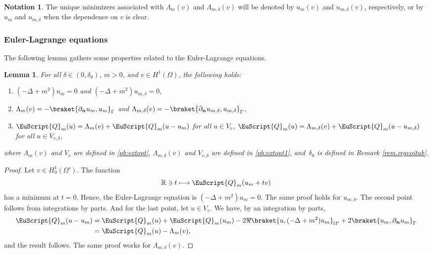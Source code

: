 \documentclass[JEP,XML,SOM,Unicode]{cedram}
\let\mathcal \EuScript
\newcommand\mto{\mathchoice{\longmapsto}{\mapsto}{\mapsto}{\mapsto}}
\newcommand{\cQ}{\mathcal{Q}}
\theoremstyle{plain}
\newtheorem{lemma}[theorem]{Lemma}
\theoremstyle{definition}
\newtheorem{notation}[theorem]{Notation}
\newcommand{\RR}{\mathbb{R}}
\newcommand{\bn}{{\boldsymbol n}}
\let\pa\partial
\begin{document}
\begin{notation}
The unique minimizers associated with $\Lambda_{m}(v)$ and $\Lambda_{m,\delta}(v)$ will be denoted by $u_m(v)$ and $u_{m,\delta}(v)$, respectively, or by $u_m$ and $u_{m,\delta}$ when the dependence on $v$ is clear.
\end{notation}

\subsubsection{Euler-Lagrange equations}

The following lemma gathers some properties related to the Euler-Lagrange equations.

\begin{lemma}\label{lem:ELE}
For all $\delta\in(0,\delta_0)$, $m>0$, and $v\in H^1(\Omega)$, the following holds:
\begin{enumerate}
\item\label{pt:cp1} $(-\Delta+m^2)u_m = 0$ and $(-\Delta+m^2)u_{m,\delta}=0$,
\item\label{pt:cp2} $\Lambda_m(v) = -\braket{\pa_\bn u_m,u_m}_\Gamma$ and $\Lambda_{m,\delta}(v) = -\braket{\pa_\bn u_{m,\delta},u_{m,\delta}}_{\Gamma}$,
\item\label{pt:cp4} $\cQ_m(u) = \Lambda_m(v) + \cQ_m(u-u_m)$ for all $u\in V_v$,
$\cQ_{m}(u) = \Lambda_{m,\delta}(v) + \cQ_{m}(u-u_{m,\delta})$ for all $u\in V_{v,\delta}$,
\end{enumerate}
where $\Lambda_m(v)$ and $V_v$ are defined in \eqref{pb:extopt}, $\Lambda_{m,\delta}(v)$ and $V_{v,\delta}$ are defined in \eqref{pb:extopt1}, and~$\delta_0$ is defined in Remark \ref{rem.regvoitub}.
\end{lemma}

\begin{proof}
Let $v\in H^1_0(\Omega')$. The function
\[
\RR\ni t\mto\cQ_m(u_m + tv)
\]
has a minimum at $t=0$. Hence, the Euler-Lagrange equation is $(-\Delta+m^2)u_m = 0$. The same proof holds for $u_{m,\delta}$. The second point follows from integrations by parts.
And for the last point, let $u\in V_v$. We have, by an integration by parts,
\[\begin{split}
\cQ_m(u-u_m)
&= \cQ_m(u)+\cQ_m(u_m) - 2\Re\braket{u,(-\Delta+m^2)u_m}_{\Omega'} + 2\braket{u_m,\pa_\bn u_m}_\Gamma
\\&
= \cQ_m(u) -\Lambda_m(v),
\end{split}\]
and the result follows. The same proof works for $\Lambda_{m,\delta}(v)$.
\end{proof}
\end{document}
